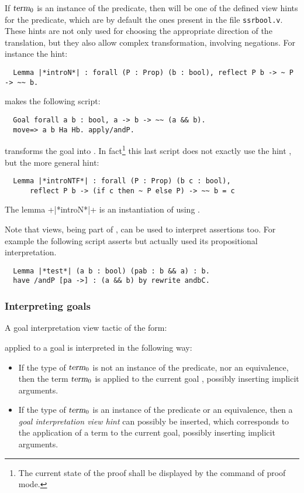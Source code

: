 If $\ssrN[0]{term}$ is an instance of the  predicate, then 
will be one of the defined view hints  for the 
predicate,  which are by
default the ones present in the file {\tt ssrbool.v}.
These hints are not only used for choosing the appropriate direction of
the translation, but they also allow complex transformation, involving
negations.
 For instance the hint:
\begin{lstlisting}
  Lemma |*introN*| : forall (P : Prop) (b : bool), reflect P b -> ~ P -> ~~ b.
\end{lstlisting}
makes the following script:
\begin{lstlisting}
  Goal forall a b : bool, a -> b -> ~~ (a && b).
  move=> a b Ha Hb. apply/andP.
\end{lstlisting}
transforms the goal into .
In fact\footnote{The current state of the proof shall be displayed by
  the  command of \Coq{} proof mode.}
this last script does not exactly use the hint , but the
more general hint:
\begin{lstlisting}
  Lemma |*introNTF*| : forall (P : Prop) (b c : bool),
      reflect P b -> (if c then ~ P else P) -> ~~ b = c
\end{lstlisting}
The lemma \ssrL+|*introN*|+ is an instantiation of  using
 .

Note that views, being part of , can be used to interpret
assertions too. For example the following script asserts 
but actually used its propositional interpretation.
\begin{lstlisting}
  Lemma |*test*| (a b : bool) (pab : b && a) : b.
  have /andP [pa ->] : (a && b) by rewrite andbC.
\end{lstlisting}

\subsubsection*{Interpreting goals}

A goal interpretation view tactic of the form:

\begin{center}
	 
\end{center}
applied to a goal  is interpreted in the following way:
\begin{itemize}
\item If the type of $\ssrN[0]{term}$ is not an instance of the
   predicate, nor an equivalence,
  then the term $\ssrN[0]{term}$ is applied to the current goal ,
  possibly inserting implicit arguments.
\item If the type of $\ssrN[0]{term}$ is an instance of the 
  predicate or an equivalence, then
a \emph{goal interpretation view hint} can possibly be inserted, which
corresponds to the application of a term
 to the current
goal, possibly inserting implicit arguments.
\end{itemize}

